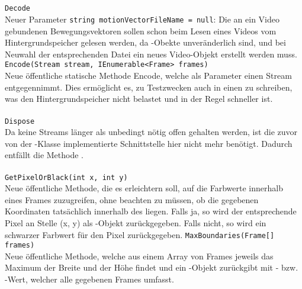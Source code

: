 \subsection{}

\paragraph{}
\begin{itemize}
	\add \verb!Decode! \\
	Neuer Parameter \verb!string motionVectorFileName = null!: Die an ein Video gebundenen Bewegungsvektoren sollen schon beim Lesen eines Videos vom Hintergrundspeicher gelesen werden, da -Obekte unveränderlich sind, und bei Neuwahl der entsprechenden Datei ein neues Video-Objekt erstellt werden muss.
	\add \verb!Encode(Stream stream, IEnumerable<Frame> frames)! \\
	Neue öffentliche statische Methode Encode, welche als Parameter einen Stream entgegennimmt. Dies ermöglicht es, zu Testzwecken auch in einen  zu schreiben, was den Hintergrundspeicher nicht belastet und in der Regel schneller ist.
\end{itemize}

\paragraph{}
\begin{itemize}
	\remove \verb!Dispose! \\
	Da keine Streams länger als unbedingt nötig offen gehalten werden, ist die zuvor von der -Klasse implementierte Schnittstelle  hier nicht mehr benötigt. Dadurch entfällt die Methode .
\end{itemize}

\paragraph{}
\begin{itemize}
	\add \verb!GetPixelOrBlack(int x, int y)! \\
	Neue öffentliche Methode, die es erleichtern soll, auf die Farbwerte innerhalb eines Frames zuzugreifen, ohne beachten zu müssen, ob die gegebenen Koordinaten tatsächlich innerhalb des  liegen. Falls ja, so wird der entsprechende Pixel an Stelle (x, y) als -Objekt zurückgegeben. Falls nicht, so wird ein schwarzer Farbwert für den Pixel zurückgegeben.
	\add \verb!MaxBoundaries(Frame[] frames)! \\
	Neue öffentliche Methode, welche aus einem Array von Frames jeweils das Maximum der Breite und der Höhe findet und ein -Objekt zurückgibt mit - bzw. -Wert, welcher alle gegebenen Frames umfasst.
\end{itemize}

